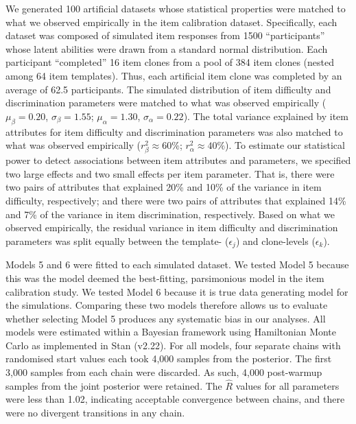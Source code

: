 \documentclass[a4paper,man,natbib]{apa6}
\begin{document}
We generated 100 artificial datasets whose statistical properties were matched to what we observed empirically in the item calibration dataset. Specifically, each dataset was composed of simulated item responses  from 1500 ``participants'' whose latent abilities were drawn from a standard normal distribution. Each participant ``completed'' 16 item clones from a pool of 384 item clones (nested among 64 item templates). Thus, each artificial item clone was completed by an average of 62.5 participants. The simulated distribution of item difficulty and discrimination parameters were matched to what was observed empirically ($\mu_\beta = 0.20$, $\sigma_\beta = 1.55$; $\mu_\alpha = 1.30$, $\sigma_\alpha = 0.22$). The total variance explained by item attributes for item difficulty and discrimination parameters was also matched to what was observed empirically ($r^2_\beta \approx 60\%$; $r^2_\alpha \approx 40\%$). To estimate our statistical power to detect associations between item attributes and parameters, we specified two large effects and two small effects per item parameter. That is, there were two pairs of attributes that explained 20\% and 10\% of the variance in item difficulty, respectively; and there were two pairs of attributes that explained 14\% and 7\% of the variance in item discrimination, respectively. Based on what we observed empirically, the residual variance in item difficulty and discrimination parameters was split equally between the template- ($\epsilon_j$) and clone-levels ($\epsilon_k$). 

Models 5 and 6 were fitted to each simulated dataset. We tested Model 5 because this was the model deemed the best-fitting, parsimonious model in the item calibration study. We tested Model 6 because it is true data generating model for the simulations. Comparing these two models therefore allows us to evaluate whether selecting Model 5 produces any systematic bias in our analyses. All models were estimated within a Bayesian framework using Hamiltonian Monte Carlo as implemented in Stan (v2.22). For all models, four separate chains with randomised start values each took 4,000 samples from the posterior. The first 3,000 samples from each chain were discarded. As such, 4,000 post-warmup samples from the joint posterior were retained. The $\hat{R}$ values for all parameters were less than 1.02, indicating acceptable convergence between chains, and there were no divergent transitions in any chain. 
\end{document}
